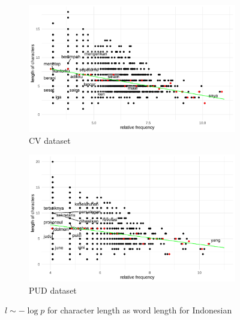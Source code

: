 \begin{figure}[H]
  \centering
  \begin{subfigure}[b]{0.48\textwidth}
    \centering
    \includegraphics[width=\textwidth]{plots/Indonesian_logp_cl_CV.pdf}
    \caption{CV dataset}
  \end{subfigure}
  \hfill
  \begin{subfigure}[b]{0.48\textwidth}
    \centering
    \includegraphics[width=\textwidth]{plots/Indonesian_logp_cl_PUD.pdf}
    \caption{PUD dataset}
  \end{subfigure}
  \caption{$l \sim -\log p$ for character length as word length for Indonesian}
\end{figure}
